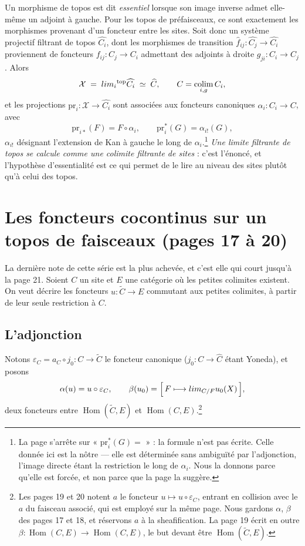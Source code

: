 \documentclass[11pt,a4paper]{article}
\begin{document}
Un morphisme de topos est dit \emph{essentiel} lorsque son image inverse admet
elle-même un adjoint à gauche. Pour les topos de préfaisceaux, ce sont
exactement les morphismes provenant d'un foncteur entre les sites. Soit donc un
système projectif filtrant de topos $\widehat{C_{i}}$, dont les morphismes de
transition $\widehat{f}_{ij} : \widehat{C_{j}} \to \widehat{C_{i}}$ proviennent
de foncteurs $f_{ij} : C_{j} \to C_{i}$ admettant des adjoints à droite
$g_{ji} : C_{i} \to C_{j}$. Alors
\[
\mathcal{X} \;=\; \varprojlim_{i}{}^{\mathrm{top}} \widehat{C_{i}}
\;\simeq\; \widehat{C}, \qquad C = \operatorname*{colim}_{i, g} C_{i},
\]
et les projections $\mathrm{pr}_{i} : \mathcal{X} \to \widehat{C_{i}}$ sont
associées aux foncteurs canoniques $\alpha_{i} : C_{i} \to C$, avec
\[
\mathrm{pr}_{i*}(F) = F \circ \alpha_{i}, \qquad
\mathrm{pr}_{i}^{*}(G) = \alpha_{i!}(G),
\]
$\alpha_{i!}$ désignant l'extension de Kan à gauche le long de
$\alpha_{i}$.\footnote{La page s'arrête sur « $\mathrm{pr}_{i}^{*}(G) =$ » :
la formule n'est pas écrite. Celle donnée ici est la nôtre — elle est
déterminée sans ambiguïté par l'adjonction, l'image directe étant la
restriction le long de $\alpha_{i}$. Nous la donnons parce qu'elle est forcée,
et non parce que la page la suggère.} \emph{Une limite filtrante de topos se
calcule comme une colimite filtrante de sites} : c'est l'énoncé, et l'hypothèse
d'essentialité est ce qui permet de le lire au niveau des sites plutôt qu'à
celui des topos.

\section*{Les foncteurs cocontinus sur un topos de faisceaux (pages 17 à 20)}

La dernière note de cette série est la plus achevée, et c'est elle qui court
jusqu'à la page 21. Soient $C$ un site et $E$ une catégorie où les petites colimites
existent. On veut décrire les foncteurs $u : \widetilde{C} \to E$ commutant aux
petites colimites, à partir de leur seule restriction à $C$.

\subsection*{L'adjonction}

Notons $\varepsilon_{C} = a_{C} \circ j_{0} : C \to \widetilde{C}$ le foncteur
canonique ($j_{0} : C \to \widehat{C}$ étant Yoneda), et posons
\[
\alpha(u) = u \circ \varepsilon_{C}, \qquad
\beta(u_{0}) = \Bigl[\, F \longmapsto \varinjlim_{C/F} u_{0}(X) \,\Bigr],
\]
deux foncteurs entre $\operatorname{Hom}(\widetilde{C}, E)$ et
$\operatorname{Hom}(C, E)$.\footnote{Les pages 19 et 20 notent $a$ le foncteur
$u \mapsto u \circ \varepsilon_{C}$, entrant en collision avec le $a$ du
faisceau associé, qui est employé sur la même page. Nous gardons $\alpha$,
$\beta$ des pages 17 et 18, et réservons $a$ à la sheafification. La page 19
écrit en outre $\beta : \operatorname{Hom}(C,E) \to \operatorname{Hom}(C,E)$,
le but devant être $\operatorname{Hom}(\widetilde{C},E)$.}
\end{document}

